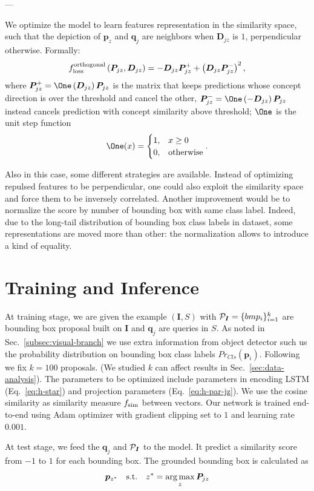 --- 

We optimize the model to learn features representation in the
similarity space, such that the depiction of $\bm{p}_z$ and $\bm{q}_j$
are neighbors when $\bm{D}_{jz}$ is $1$, perpendicular otherwise.
Formally:
\begin{equation}
  f_{\text{loss}}^{\text{orthogonal}} \left( \bm{P}_{jz}, \bm{D}_{jz} \right) = - \bm{D}_{jz} \bm{P}^+_{jz} + \left( \bm{D}_{jz} \bm{P}^-_{jz} \right)^2,
\end{equation}
where $\bm{P}^+_{jz} = \One\left( \bm{D}_{jz} \right) \bm{P}_{jz}$
is the matrix that keeps predictions whose concept direction is over
the threshold and cancel the other, $\bm{P}^-_{jz} = \One\left( -
\bm{D}_{jz} \right) \bm{P}_{jz}$ instead cancels prediction with
concept similarity above threshold; $\One$ is the unit step function
\begin{equation}
  \One(x) =
  \begin{cases}
    1, & x \geq 0 \\
    0, & \text{otherwise}
  \end{cases}.
\end{equation}

Also in this case, some different strategies are available. Instead of
optimizing repulsed features to be perpendicular, one could also
exploit the similarity space and force them to be inversely
correlated. Another improvement would be to normalize the score by
number of bounding box with same class label. Indeed, due to the
long-tail distribution of bounding box class labels in dataset, some
representations are moved more than other: the normalization allows to
introduce a kind of equality.

\section{Training and Inference}
\label{sec:training-and-inference}

At training stage, we are given the example $(\bm{I}, S)$ with
$\mathcal{P}_{\bm{I}} = \{ bm{p}_i \}^k_{i=1}$ are bounding box proposal
built on $\bm{I}$ and $\bm{q}_j$ are queries in $S$. As noted in
Sec.~\ref{subsec:visual-branch} we use extra information from object
detector such us the probability distribution on bounding box class
labels $Pr_{Cls}(\bm{p}_i)$. Following \cite{chen2018knowledge} we fix
$k = 100$ proposals. (We studied $k$ can affect results in
Sec.~\ref{sec:data-analysis}). The parameters to be optimized include
parameters in encoding LSTM (Eq.~\ref{eq:h-star}) and projection
parameters (Eq.~\ref{eq:h-par-jz}). We use the cosine similarity as
similarity measure $f_{\text{sim}}$ between vectors. Our network is trained
end-to-end using Adam optimizer with gradient clipping set to $1$ and
learning rate $0.001$.

At test stage, we feed the $\bm{q}_j$ and $\mathcal{P}_{\bm{I}}$ to the model. It predict a similarity score from $-1$ to $1$ for each bounding box. The grounded bounding box is calculated as
\begin{equation}
  \bm{p}_{z^*} \quad \text{s.t.} \quad z^* = \operatorname*{arg\,max}_z \bm{P}_{jz}
\end{equation}
